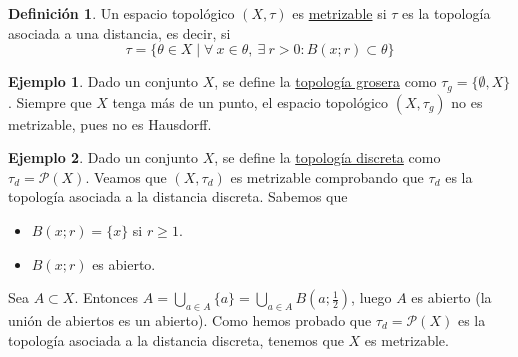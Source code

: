 \documentclass[12pt]{report}
\theoremstyle{definition}
\newtheorem{definition}{Definición}[chapter]
\theoremstyle{definition}
\newtheorem{example}{Ejemplo}[chapter]
\theoremstyle{remark}
\begin{document}
\vspace{2mm}
\begin{definition}
Un espacio topológico $(X,\tau)$ es \underline{metrizable} si $\tau$ es la topología asociada a una distancia, es decir, si \[\tau = \{\theta \in X \mid \forall \ x \in \theta, \ \exists \ r>0 \colon B(x;r) \subset \theta\}\]
\end{definition}

\begin{example}
Dado un conjunto $X$, se define la \underline{topología grosera} como $\tau_g=\{\emptyset, X\}$. Siempre que $X$ tenga más de un punto, el espacio topológico $(X,\tau_g)$ no es metrizable, pues no es Hausdorff.
\end{example}

\begin{example}
Dado un conjunto $X$, se define la \underline{topología discreta} como $\tau_d=\mathcal{P}(X)$. Veamos que $(X,\tau_d)$ es metrizable comprobando que $\tau_d$ es la topología asociada a la distancia discreta. Sabemos que
\begin{itemize}
    \item $B(x;r)=\{x\}$ si $r\geq1$.
    \item $B(x;r)$ es abierto.
\end{itemize}
Sea $A \subset X$. Entonces $A = \bigcup_{a \in A}\{a\} = \bigcup_{a \in A}B(a;\frac{1}{2})$, luego $ A$ es abierto (la unión de abiertos es un abierto). Como hemos probado que $\tau_d = \mathcal{P}(X)$ es la topología asociada a la distancia discreta, tenemos que $X$ es metrizable.
\end{example}
\end{document}
